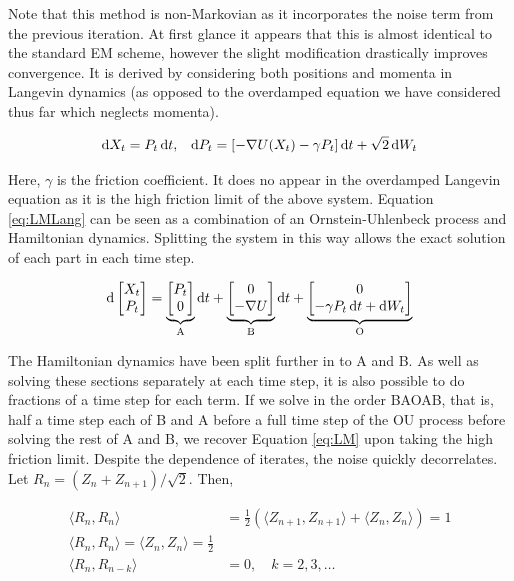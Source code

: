 Note that this method is non-Markovian as it incorporates the noise term from the previous iteration. At first glance it appears that this is almost identical to the standard EM scheme, however the slight modification drastically improves convergence.  It is derived by considering both positions and momenta in Langevin dynamics (as opposed to the overdamped equation we have considered thus far which neglects momenta).

\begin{align} \mathop{}\!\mathrm{d} X_t = P_t \mathop{}\!\mathrm{d} t, && \mathop{}\!\mathrm{d} P_t = \lbrack -\nabla U(X_t) - \gamma P_t \rbrack \mathop{}\!\mathrm{d} t + \sqrt{2} \mathop{}\!\mathrm{d} W_t \label{eq:LMLang} \end{align}

Here, \(\gamma\) is the friction coefficient. It does no appear in the overdamped Langevin equation as it is the high friction limit of the above system.  Equation \eqref{eq:LMLang} can be seen as a combination of an Ornstein-Uhlenbeck process and Hamiltonian dynamics. Splitting the system in this way allows the exact solution of each part in each time step.

\[ \mathop{}\!\mathrm{d} \begin{bmatrix} X_t\\P_t \end{bmatrix} = \underbrace{\begin{bmatrix} P_t \\ 0 \end{bmatrix}}_{\text{A}} \mathop{}\!\mathrm{d} t + \underbrace{\begin{bmatrix}  0\\-\nabla U \end{bmatrix}}_{\text{B}} \mathop{}\!\mathrm{d} t + \underbrace{\begin{bmatrix} 0\\ -\gamma P_t \mathop{}\!\mathrm{d} t + \mathop{}\!\mathrm{d} W_t \end{bmatrix}}_{\text{O}} \]

The Hamiltonian dynamics have been split further in to A and B.  As well as solving these sections separately at each time step, it is also possible to do fractions of a time step for each term. If we solve in the order BAOAB, that is, half a time step each of B and A before a full time step of the OU process before solving the rest of A and B, we recover Equation \eqref{eq:LM} upon taking the high friction limit. Despite the dependence of iterates, the noise quickly decorrelates. Let \(R_n = (Z_n+Z_{n+1})/\sqrt{2}\). Then,

\begin{align*}
    \langle R_n,R_n\rangle  &= \frac{1}{2} \left( \langle Z_{n+1},Z_{n+1}\rangle +\langle Z_{n},Z_{n}\rangle\right) =1\\
    \langle R_n,R_n\rangle = \langle Z_n,Z_n\rangle = \frac{1}{2}\\
    \langle R_n,R_{n-k} \rangle &= 0,   \quad k=2,3,\dots 
\end{align*}


